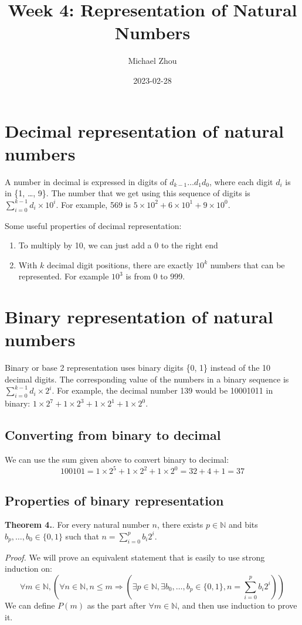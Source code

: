 \documentclass{article}
\title{Week 4: Representation of Natural Numbers}
\author{Michael Zhou}
\date{2023-02-28}
\newcounter{thcount}
\newcommand\tr{\stepcounter{thcount} \textbf{Theorem 4.\thethcount}. }
\begin{document}
\maketitle
\section{Decimal representation of natural numbers}
A number in decimal is expressed in digits of $d_{k-1} \ldots d_1d_0$, 
where each digit $d_i$ is in \{1, \ldots, 9\}. The number that we get 
using this sequence of digits is $\sum_{i=0}^{k-1} d_i \times 10^i$. 
For example, 569 is $5 \times 10^2 + 6 \times 10^1 + 9 \times 10^0$.

Some useful properties of decimal representation:
\begin{enumerate}
    \item To multiply by 10, we can just add a 0 to the right end
    \item With $k$ decimal digit positions, there are exactly $10^k$ 
        numbers that can be represented. For example $10^3$ is from 0 to 999. 
\end{enumerate}

\section{Binary representation of natural numbers}
Binary or base 2 representation uses binary digits \{0, 1\} instead of 
the 10 decimal digits. The corresponding value of the numbers in a binary sequence 
is $\sum_{i=0}^{k-1} d_i \times 2^i$. For example, the decimal number 139 would 
be 10001011 in binary: $1 \times 2^7 + 1 \times 2^3 + 1 \times 2^1 + 1 \times 
2^0$. 

\subsection{Converting from binary to decimal}
We can use the sum given above to convert binary to decimal:
$$100101 = 1 \times 2^5 + 1 \times 2^2 + 1 \times 2^0 = 32 + 4 + 1 = 37 $$

\subsection{Properties of binary representation}
\tr For every natural number $n$, there exists $p \in \mathbb{N}$ and bits 
$b_p, \ldots, b_0 \in \{0, 1\}$ such that $n = \sum_{i=0}^{p} b_i2^i$.

\textit{Proof.} We will prove an equivalent statement that is easily to 
use strong induction on:
$$\forall m \in \mathbb{N}, \left(\forall n \in \mathbb{N}, n \leq m 
    \Rightarrow ( \exists p \in \mathbb{N}, \exists b_0, \ldots, b_p 
    \in \{0, 1\}, n = \sum_{i=0}^{p} b_i 2^i ) \right)$$
We can define $P(m)$ as the part after $\forall m \in \mathbb{N}$, and then use 
induction to prove it.
\end{document}
